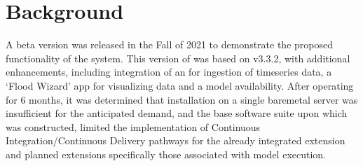 \documentclass[letterpaper,12pt,english,openany,oneside]{sphinxmanual}
\begin{document}
\section{Background}
\label{\detokenize{euidev/background/index:background}}\label{\detokenize{euidev/background/index::doc}}
\sphinxAtStartPar
A beta version  was released in the Fall of 2021 to demonstrate the proposed functionality of the system. This version of  was based on  v3.3.2, with additional enhancements, including integration of an  for ingestion of timeseries  data, a ‘Flood Wizard’ app for visualizing data and a  model availability. After operating for 6 months, it was determined that installation on a single bare\sphinxhyphen{}metal server was insufficient for the anticipated  demand, and the base software suite upon which  was constructed, limited the implementation of Continuous Integration/Continuous Delivery pathways for the already integrated extension and planned extensions \sphinxhyphen{} specifically those associated with  model execution.
\end{document}
